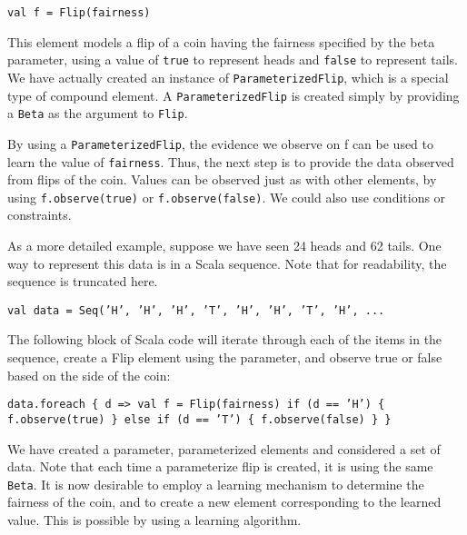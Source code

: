 \begin{flushleft}
\texttt{val f = Flip(fairness)}
\end{flushleft}

This element models a flip of a coin having the fairness specified by the beta parameter, using a value of \texttt{true} to represent heads and \texttt{false} to represent tails. We have actually created an instance of \texttt{ParameterizedFlip}, which is a special type of compound element. A  \texttt{ParameterizedFlip} is created simply by providing a \texttt{Beta} as the argument to \texttt{Flip}.

By using a \texttt{ParameterizedFlip}, the evidence we observe on f can be used to learn the value of \texttt{fairness}. Thus, the next step is to provide the data observed from flips of the coin. Values can be observed just as with other elements, by using \texttt{f.observe(true)} or \texttt{f.observe(false)}. We could also use conditions or constraints.

As a more detailed example, suppose we have seen 24 heads and 62 tails. One way to represent this data is in a Scala sequence. Note that for readability, the sequence is truncated here.

\begin{flushleft}
\texttt{val data = Seq('H', 'H', 'H', 'T', 'H', 'H', 'T', 'H', ...}
\end{flushleft}

The following block of Scala code will iterate through each of the items in the sequence, create a Flip element using the parameter, and observe true or false based on the side of the coin:

\begin{flushleft}
\texttt{data.foreach \{ d =>
\newline \tab val f = Flip(fairness)
\newline \tab \tab if (d == 'H') \{
\newline \tab \tab f.observe(true)
\newline \tab \} else if (d == 'T') \{ 
\newline \tab \tab f.observe(false)
\newline \tab \}
\newline \}
}
\end{flushleft}

We have created a parameter, parameterized elements and considered a set of data. Note that each time a parameterize flip is created, it is using the same \texttt{Beta}. It is now desirable to employ a learning mechanism to determine the fairness of the coin, and to create a new element corresponding to the learned value. This is possible by using a learning algorithm.

